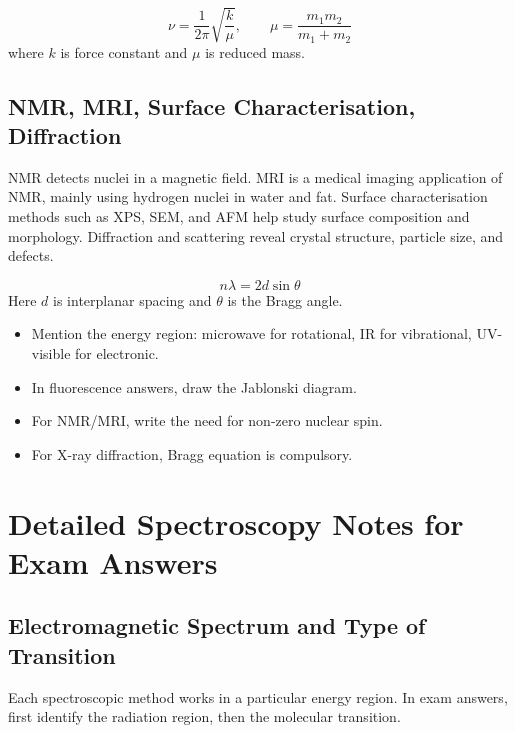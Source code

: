 \documentclass[12pt,a4paper]{article}
\begin{document}
\begin{tcolorbox}[formulabox, title={Vibrational Frequency of a Diatomic Molecule}]
\[
\nu=\frac{1}{2\pi}\sqrt{\frac{k}{\mu}},\qquad
\mu=\frac{m_1m_2}{m_1+m_2}
\]
where $k$ is force constant and $\mu$ is reduced mass.
\end{tcolorbox}

\subsection{NMR, MRI, Surface Characterisation, Diffraction}
NMR detects nuclei in a magnetic field. MRI is a medical imaging application of NMR, mainly using hydrogen nuclei in water and fat. Surface characterisation methods such as XPS, SEM, and AFM help study surface composition and morphology. Diffraction and scattering reveal crystal structure, particle size, and defects.

\begin{tcolorbox}[formulabox, title={Bragg Equation}]
\[
n\lambda=2d\sin\theta
\]
Here $d$ is interplanar spacing and $\theta$ is the Bragg angle.
\end{tcolorbox}

\begin{tcolorbox}[exambox, title={Exam Points}]
\begin{itemize}[leftmargin=*, itemsep=2pt, topsep=2pt]
  \item Mention the energy region: microwave for rotational, IR for vibrational, UV-visible for electronic.
  \item In fluorescence answers, draw the Jablonski diagram.
  \item For NMR/MRI, write the need for non-zero nuclear spin.
  \item For X-ray diffraction, Bragg equation is compulsory.
\end{itemize}
\end{tcolorbox}

\section{Detailed Spectroscopy Notes for Exam Answers}

\subsection{Electromagnetic Spectrum and Type of Transition}
Each spectroscopic method works in a particular energy region. In exam answers, first identify the radiation region, then the molecular transition.
\end{document}
